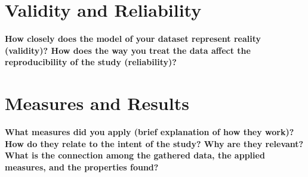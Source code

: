 \documentclass[12pt, a4paper]{article}
\begin{document}
\section{Validity and Reliability}
	\label{validity-and-reliability-not-needed-for-the-project-proposal}

	\textbf{How closely does the model of your dataset represent reality (validity)? How does the way you treat the data affect the reproducibility of the study (reliability)?}


\section{Measures and Results}
	\label{measures}

	\textbf{What measures did you apply (brief explanation of how they work)? How do they relate to the intent of the study? Why are they relevant? What is the connection among the gathered data, the applied measures, and the properties found?}\\
	
	
\end{document}
